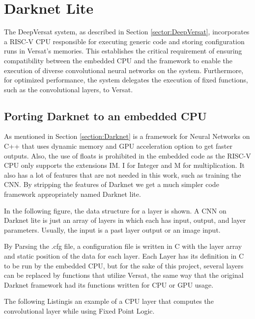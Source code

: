 \chapter{Darknet Lite}
\label{chapter:Darknet}


The DeepVersat system, as described in Section \ref{sector:DeepVersat}, incorporates a RISC-V CPU responsible for executing generic code and storing configuration runs in Versat's memories. 
This establishes the critical requirement of ensuring compatibility between the embedded CPU and the framework to enable the execution of diverse convolutional neural networks on the system. 
Furthermore, for optimized performance, the system delegates the execution of fixed functions, such as the convolutional layers, to Versat.

\section{Porting Darknet to an embedded CPU}

As mentioned in Section \ref{section:Darknet} is a framework for Neural Networks on C++ that uses dynamic memory and GPU acceleration option to get faster outputs.
Also, the use of floats is prohibited in the embedded code as the RISC-V CPU only supports the extensions IM. I for Integer and M for multiplication.
It also has a lot of features that are not needed in this work, such as training the CNN.
By stripping the features of Darknet we get a much simpler code framework appropriately named Darknet lite.

In the following figure, the data structure for a layer is shown. 
A CNN on Darknet lite is just an array of layers in which each has input, output, and layer parameters. 
Usually, the input is a past layer output or an image input.



By Parsing the .cfg file, a configuration file is written in C with the layer array and static position of the data for each layer. 
Each Layer has its definition in C to be run by the embedded CPU, but for the sake of this project, several layers can be replaced by functions that utilize Versat, the same way that the original Darknet framework had its functions written for CPU or GPU usage.

The following Listingis an example of a CPU layer that computes the convolutional layer while using Fixed Point Logic.

